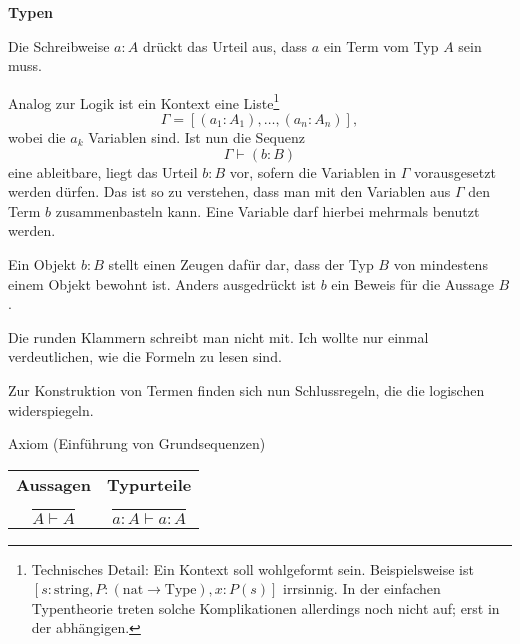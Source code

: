 \documentclass[8pt]{beamer}
\newcommand{\strong}[1]{\textsf{\textbf{#1}}}
\newcommand{\parspace}{\vspace{0.8em}}
\begin{document}
\begin{frame}[t]
\strong{Typen}

\vspace{3em}
Die Schreibweise $a\colon A$ drückt das Urteil aus, dass $a$ ein Term
vom Typ $A$ sein muss.\pause

\parspace
Analog zur Logik ist ein Kontext eine Liste\footnote{Technisches Detail:
Ein Kontext soll wohlgeformt sein. Beispielsweise ist
$[s\colon\mathrm{string}, P\colon (\mathrm{nat}\to\mathrm{Type}), x\colon P(s)]$
irrsinnig. In der einfachen Typentheorie treten solche Komplikationen
allerdings noch nicht auf; erst in der abhängigen.}
\[\Gamma = [(a_1\colon A_1),\ldots,(a_n\colon A_n)],\]
wobei die $a_k$ Variablen sind. Ist nun die Sequenz
\[\Gamma\vdash (b\colon B)\]
eine ableitbare, liegt das Urteil $b\colon B$ vor, sofern die Variablen
in $\Gamma$ vorausgesetzt werden dürfen. Das ist so zu verstehen,
dass man mit den Variablen aus $\Gamma$ den Term $b$ zusammenbasteln kann.
Eine Variable darf hierbei mehrmals benutzt werden.

\parspace
Ein Objekt $b\colon B$ stellt einen Zeugen dafür dar, dass der Typ
$B$ von mindestens einem Objekt bewohnt ist. Anders ausgedrückt ist
$b$ ein Beweis für die Aussage $B$.

\parspace
\begin{small}
Die runden Klammern schreibt man nicht mit. Ich wollte nur einmal
verdeutlichen, wie die Formeln zu lesen sind.
\end{small}
\end{frame}

\begin{frame}
Zur Konstruktion von Termen finden sich nun Schlussregeln, die die
logischen widerspiegeln.\pause

\begin{block}{Axiom (Einführung von Grundsequenzen)}
\begin{center}
\begin{tabular}{c@{\qquad\qquad}c}
\strong{Aussagen} & \strong{Typurteile}\\[10pt]
$\dfrac{}{A\vdash A}$ & $\dfrac{}{a\colon A\vdash a\colon A}$
\end{tabular}
\end{center}
\end{block}
\end{frame}
\end{document}
